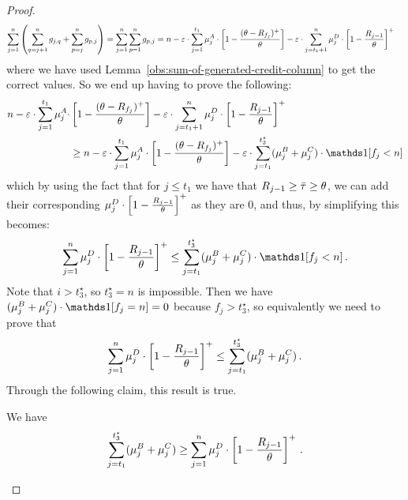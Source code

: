 \begin{proof}
    \begin{align*}
        \sum_{j=1}^n &\left(\sum_{q=j+1}^{n} g_{j,q} + \sum_{p=j}^{n} g_{p,j} \right) 
        = \sum_{j=1}^n \sum_{p=1}^{n} g_{p,j}= 
         n - \varepsilon\cdot \sum_{j=1}^{t_1} \mu_j^A \cdot\left[1 -\frac{(\theta-R_{f_j})^+}{\theta}\right] - \varepsilon\cdot \sum_{j=t_1+1}^n \mu_j^D \cdot\left[1 -\frac{R_{j-1}}{\theta}\right]^+
    \end{align*}
    where we have used Lemma~\ref{obs:sum-of-generated-credit-column} to get the correct values. So we end up having to prove the following:
    \begin{align*}
        n - \Mcoeffmone\cdot \sum_{j=1}^{t_1} \mu_j^A \cdot&\left[1 -\frac{(\MRttwo-R_{f_j})^+}{\MRttwo}\right]- \Mcoeffmone\cdot \sum_{j=t_1+1}^n \mu_j^D \cdot\left[1 -\frac{R_{j-1}}{\MRttwo}\right]^+ \\
        &\geq n - \Mcoeffmone\cdot \sum_{j=1}^{t_1} \mu_j^A \cdot\left[1 -\frac{(\MRttwo-R_{f_j})^+}{\MRttwo}\right] - \Mcoeffmone \cdot \sum_{j=t_1}^{t_3^\star}(\mu_j^B+\mu_j^C)\cdot \ind[f_j<n]
    \end{align*}
    which by using the fact that for $j\leq t_1$ we have that $R_{j-1}\geq \bar\tau\geq \theta$, we can add their corresponding $\mu_j^D \cdot\left[1 -\frac{R_{j-1}}{\theta}\right]^+$ as they are $0$, and thus, by simplifying this becomes:
    \begin{equation*}
        \sum_{j=1}^n \mu_j^D \cdot\left[1 -\frac{R_{j-1}}{\MRttwo}\right]^+ \leq \sum_{j=t_1}^{t_3^\star}(\mu_j^B+\mu_j^C)\cdot \ind[f_j<n]\,.
    \end{equation*}
    Note that $i > t_3^\star$, so $t_3^\star = n$ is impossible.
    Then we have $(\mu_j^B+\mu_j^C)\cdot \ind[f_j=n] = 0$ because $f_j > t_3^\star$, so equivalently we need to prove that 
    \begin{equation*}
        \sum_{j=1}^n \mu_j^D \cdot\left[1 -\frac{R_{j-1}}{\theta}\right]^+ \leq \sum_{j=t_1}^{t_3^\star}(\mu_j^B+\mu_j^C)\,.
    \end{equation*}
    Through the following claim, this result is true.
    \begin{claim}\label{clm:b-size}
        We have
        \[\sum_{j=t_1}^{t_3^\star}(\mu_j^B+\mu_j^C) \geq \sum_{j=1}^n \mu_j^D \cdot\left[1 -\frac{R_{j-1}}{\theta}\right]^+\,.\]
    \end{claim}


\end{proof}
